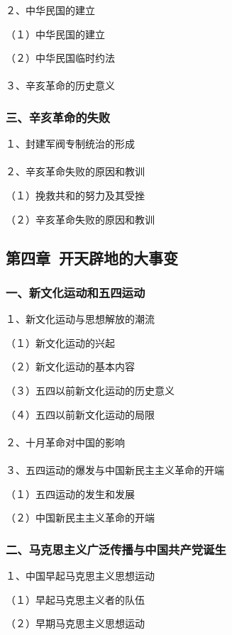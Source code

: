 \documentclass{ctexart}
\begin{document}
２、中华民国的建立

（１）中华民国的建立

（２）中华民国临时约法
\\\\

３、辛亥革命的历史意义

\subsubsection{三、辛亥革命的失败}

１、封建军阀专制统治的形成
\\\\

２、辛亥革命失败的原因和教训

（１）挽救共和的努力及其受挫

（２）辛亥革命失败的原因和教训


\subsection{第四章\ 开天辟地的大事变}

\subsubsection{一、新文化运动和五四运动}
１、新文化运动与思想解放的潮流

（１）新文化运动的兴起

（２）新文化运动的基本内容

（３）五四以前新文化运动的历史意义

（４）五四以前新文化运动的局限
\\\\

２、十月革命对中国的影响
\\\\

３、五四运动的爆发与中国新民主主义革命的开端

（１）五四运动的发生和发展

（２）中国新民主主义革命的开端

\subsubsection{二、马克思主义广泛传播与中国共产党诞生}

１、中国早起马克思主义思想运动

（１）早起马克思主义者的队伍

（２）早期马克思主义思想运动
\end{document}
